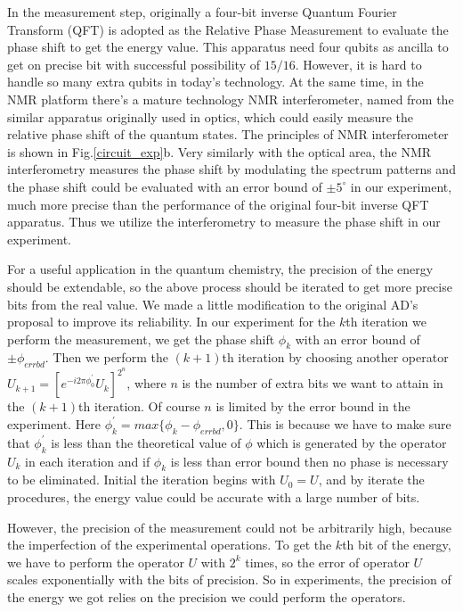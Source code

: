 \documentclass[twocolumn,showpacs,twoside,10pt,superscriptaddress,prl]{revtex4}
\begin{document}
In the measurement step, originally a four-bit inverse Quantum
Fourier Transform (QFT) is adopted as the Relative Phase Measurement
to evaluate the phase shift to get the energy value. This apparatus
need four qubits as ancilla to get on precise bit with successful
possibility of $15/16$\cite{qcqi}. However, it is hard to handle so
many extra qubits in today's technology. At the same time, in the
NMR platform there's a mature technology NMR interferometer, named
from the similar apparatus originally used in optics, which could
easily measure the relative phase shift of the quantum
states\cite{du_geophase,peng_comple}. The principles of NMR
interferometer is shown in Fig.\ref{circuit_exp}b. Very similarly
with the optical area, the NMR interferometry measures the phase
shift by modulating the spectrum patterns and the phase shift could
be evaluated with an error bound of $\pm5^\circ$ in our experiment,
much more precise than the performance of the original four-bit
inverse QFT apparatus. Thus we utilize the interferometry to measure
the phase shift in our experiment.


For a useful application in the quantum chemistry, the precision of
the energy should be extendable, so the above process should be
iterated to get more precise bits from the real value. We made a
little modification to the original AD's proposal to improve its
reliability. In our experiment for the $k$th iteration we perform
the measurement, we get the phase shift $\phi_k$ with an error bound
of $\pm\phi_{errbd}$. Then we perform the $(k+1)$th iteration by
choosing another operator $U_{k+1}=[e^{-i2\pi\phi^{'}_0}U_k]^{2^n}$,
where $n$ is the number of extra bits we want to attain in the
$(k+1)$th iteration. Of course $n$ is limited by the error bound in
the experiment. Here $\phi^{'}_k=max\{\phi_k-\phi_{errbd},0\}$. This
is because we have to make sure that $\phi^{'}_k$ is less than the
theoretical value of $\phi$ which is generated by the operator $U_k$
in each iteration and if $\phi_k$ is less than error bound then no
phase is necessary to be eliminated. Initial the iteration begins
with $U_0=U$, and by iterate the procedures, the energy value could
be accurate with a large number of bits.

However, the precision of the measurement could not be arbitrarily
high, because the imperfection of the experimental operations. To
get the $k$th bit of the energy, we have to perform the operator $U$
 with $2^k$ times, so the error of operator $U$ scales exponentially
 with the bits of precision. So in experiments, the precision of the
 energy we got relies on the precision we could perform the
 operators.
\end{document}
